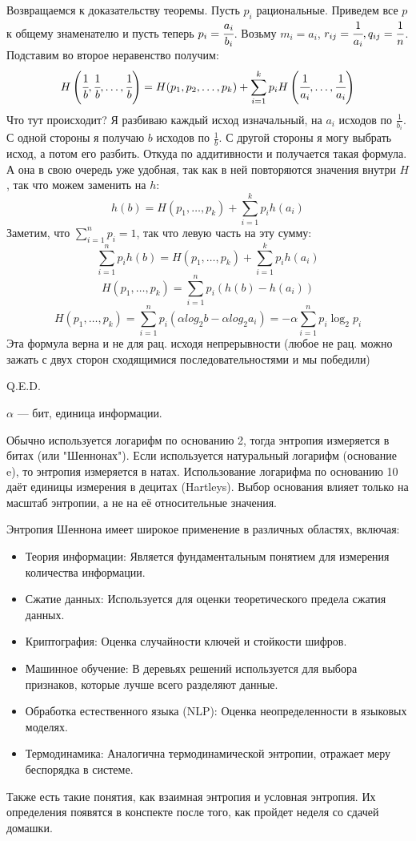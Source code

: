Возвращаемся к доказательству теоремы. Пусть $p_i$ рациональные. Приведем все $p$ к общему знаменателю и пусть теперь $p_i  = \cfrac{a_i}{b_i}$. Возьму $m_i = a_i$, $r_{ij}=\cfrac{1}{a_i}, q_{ij} = \cfrac{1}{n}$. Подставим во второе неравенство получим:
$$H\left(\cfrac{1}{b},\cfrac{1}{b},\ldots, \cfrac{1}{b}\right)= H(p_1,p_2,\ldots,p_k) + \sum\limits_{i=1}^kp_i H\left(\cfrac{1}{a_i},\ldots,\cfrac{1}{a_i}\right)$$
Что тут происходит? Я разбиваю каждый исход изначальный, на $a_i$ исходов по $\frac{1}{b_i}$. С одной стороны я получаю $b$ исходов по $\frac{1}{b}$. С другой стороны я могу выбрать исход, а потом его разбить. Откуда по аддитивности и получается такая формула. А она в свою очередь уже удобная, так как в ней повторяются значения внутри $H$, так что можем заменить на $h$:
$$h(b) = H(p_1,\ldots,p_k)+\sum\limits_{i=1}^kp_ih(a_i)$$
Заметим, что $\sum\limits_{i=1}^np_i=1$, так что левую часть на эту сумму:
$$\sum\limits_{i=1}^np_ih(b) = H(p_1,\ldots,p_k)+\sum\limits_{i=1}^kp_ih(a_i)$$
$$H(p_1,\ldots,p_k)=\sum\limits_{i=1}^np_i(h(b)-h(a_i))$$
$$H(p_1,\ldots,p_k)=\sum\limits_{i=1}^np_i(\alpha log_2b-\alpha log_2a_i) = -\alpha\sum\limits_{i=1}^np_i\log_2 p_i$$
Эта формула верна и не для рац. исходя непрерывности (любое не рац. можно зажать с двух сторон сходящимися последовательностями и мы победили)

\hfill Q.E.D.

$\alpha$ --- бит, единица информации.

Обычно используется логарифм по основанию 2, тогда энтропия измеряется в битах (или "Шеннонах"). Если используется натуральный логарифм (основание e), то энтропия измеряется в натах. Использование логарифма по основанию 10 даёт единицы измерения в децитах (Hartleys). Выбор основания влияет только на масштаб энтропии, а не на её относительные значения.

Энтропия Шеннона имеет широкое применение в различных областях, включая:

\begin{itemize}
    \item Теория информации: Является фундаментальным понятием для измерения количества информации.
    \item Сжатие данных: Используется для оценки теоретического предела сжатия данных.
    \item Криптография: Оценка случайности ключей и стойкости шифров.
    \item Машинное обучение: В деревьях решений используется для выбора признаков, которые лучше всего разделяют данные.
    \item Обработка естественного языка (NLP): Оценка неопределенности в языковых моделях.
    \item Термодинамика: Аналогична термодинамической энтропии, отражает меру беспорядка в системе.
\end{itemize}

Также есть такие понятия, как взаимная энтропия и условная энтропия. Их определения появятся в конспекте после того, как пройдет неделя со сдачей домашки.
